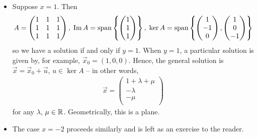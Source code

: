 \documentclass{../template/note}
\begin{document}
\begin{example}
\begin{itemize}
\begin{align*}
\begin{pmatrix}
                \end{pmatrix} \\
                &= \frac{1}{(1-x)(x+2)} \begin{pmatrix}
                 y-x \\
                 -x+y \\
                 2-xy-y \\
                \end{pmatrix}
            \end{align*}
            so we have a unique solution.
            \item Suppose \(x = 1\). Then
            \begin{align*}
                A = \begin{pmatrix}
                 1 & 1 & 1 \\
                 1 & 1 & 1 \\
                 1 & 1 & 1 \\
                \end{pmatrix},\; \operatorname{Im} A = \operatorname{span}\left\{\begin{pmatrix}
                 1 \\
                 1 \\
                 1 \\
                \end{pmatrix}\right\},\; \ker A = \operatorname{span}\left\{\begin{pmatrix}
                 1 \\
                 -1 \\
                 0 \\
                \end{pmatrix}, \begin{pmatrix}
                 1 \\
                 0 \\
                 -1 \\
                \end{pmatrix}\right\}
            \end{align*}
            so we have a solution if and only if \(y=1\). When \(y=1\), a particular solution is given by, for example, \(\vec x_0 = (1, 0, 0)\). Hence, the general solution is \(\vec x = \vec x_0 + \vec u\), \(u \in \ker A\) -- in other words,
            \begin{align*}
                \vec x = \begin{pmatrix}
                 1+\lambda + \mu \\
                 -\lambda \\
                 -\mu \\
                \end{pmatrix}
            \end{align*}
            for any \(\lambda\), \(\mu \in \mathbb R\). Geometrically, this is a plane.
            \item The case \(x=-2\) proceeds similarly and is left as an exercise to the reader.
        \end{itemize}
    \end{example}
    
\end{document}
